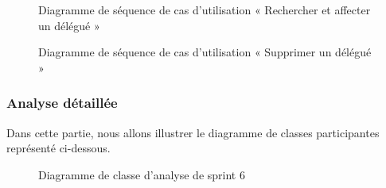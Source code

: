 \begin{figure}[H]
  \centering
  \caption{Diagramme de séquence de cas d'utilisation « Rechercher et affecter un délégué »}
  \label{fig:sequence_search_affect_delegation}
\end{figure}

\begin{figure}[H]
  \centering
  \caption{Diagramme de séquence de cas d'utilisation « Supprimer un délégué »}
  \label{fig:sequence_annulation_delegation}
\end{figure}




\subsubsection{Analyse détaillée}

Dans cette partie, nous allons illustrer le diagramme de classes participantes représenté ci-dessous.


\setlength{\parskip}{1em}
\setlength{\parindent}{0em}



\begin{figure}[H]
  \centering
  \caption{Diagramme de classe d'analyse de sprint 6}
  \label{fig:class_analyse_sprint6}
\end{figure}


